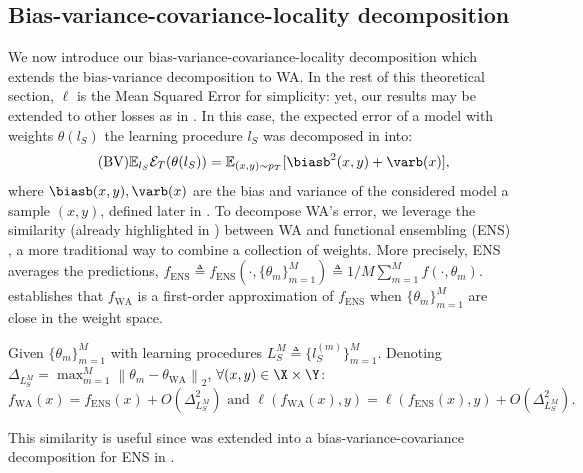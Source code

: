 \subsection{Bias-variance-covariance-locality decomposition}
\label{subsec:biasvariance}
We now introduce our bias-variance-covariance-locality decomposition which extends the bias-variance decomposition \cite{kohavi1996bias} to WA.
In the rest of this theoretical section, $\ell$ is the Mean Squared Error for simplicity: yet, our results may be extended to other losses as in \cite{domingos2000unified}.
In this case, the expected error of a model with weights $\theta(l_S)$ \wrt the learning procedure $l_S$ was decomposed in \cite{kohavi1996bias} into:
\begin{equation} \tag{BV}\label{eq:b_v}
    \mathbb{E}_{l_S}\mathcal{E}_T(\theta(l_S)) = \mathbb{E}_{(x,y)\sim p_T}[\biasb^2(x, y)+\varb(x)],
\end{equation}
where $\biasb(x,y), \varb(x)$ are the bias and variance of the considered model \wrt a sample $(x,y)$, defined later in .
To decompose WA's error, we leverage the similarity (already highlighted in \cite{izmailov2018}) between WA and functional ensembling (ENS) \cite{Lakshminarayanan2017,dietterich2000ensemble}, a more traditional way to combine a collection of weights.
More precisely, ENS averages the predictions, $f_{\text{ENS}} \triangleq f_{\text{ENS}}(\cdot, \{\theta_m\}_{m=1}^M) \triangleq 1/M \sum_{m=1}^{M} f(\cdot, \theta_m)$.
 establishes that $f_{\text{WA}}$ is a first-order approximation of $f_{\text{ENS}}$ when $\{\theta_m\}_{m=1}^M$ are close in the weight space.
\begin{lemma} \label{lemma:wa_ensembling}
    Given $\{\theta_m\}_{m=1}^M$ with learning procedures $L_S^M\triangleq\{l_S^{(m)}\}_{m=1}^M$. Denoting $\Delta_{L_S^M}=\max_{m=1}^{M}\left\|\theta_m-\theta_{\text{WA}}\right\|_2$, $\forall (x,y) \in \X \times \Y$:%
    \begin{equation*}
        f_{\text{WA}}(x) = f_{\text{ENS}}(x) + O(\Delta^2_{L_S^M}) \text{~and~} \ell\left(f_{\text{WA}}(x), y\right) = \ell\left(f_{\text{ENS}}(x) , y\right) + O(\Delta_{L_S^M}^2).%
    \end{equation*}%
\end{lemma}%
This similarity is useful since  was extended into a bias-variance-covariance decomposition for ENS in \cite{ueda1996generalization,brown2005between}.
